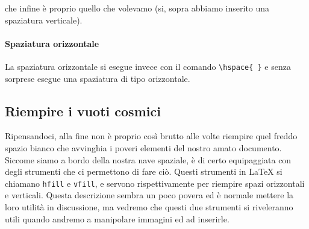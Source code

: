 \vspace{25px}

\noindent che infine è proprio quello che volevamo (si, sopra abbiamo inserito 
una spaziatura verticale).

\paragraph*{Spaziatura orizzontale} La spaziatura orizzontale si esegue invece 
con il comando \verb!\hspace{ }! e senza sorprese esegue una spaziatura di tipo 
orizzontale.

\subsection{Riempire i vuoti cosmici}

Ripensandoci, alla fine non è proprio così brutto alle volte riempire quel 
freddo spazio bianco che avvinghia i poveri elementi del nostro amato 
documento. Siccome siamo a bordo della nostra nave spaziale, è di certo 
equipaggiata con degli strumenti che ci permettono di fare ciò. Questi 
strumenti in \LaTeX{} si chiamano \texttt{hfill} e \texttt{vfill}, e servono 
rispettivamente per riempire spazi orizzontali e verticali. Questa descrizione 
sembra un poco povera ed è normale mettere la loro utilità in discussione, ma 
vedremo che questi due strumenti si riveleranno utili quando andremo a 
manipolare immagini ed ad inserirle.

